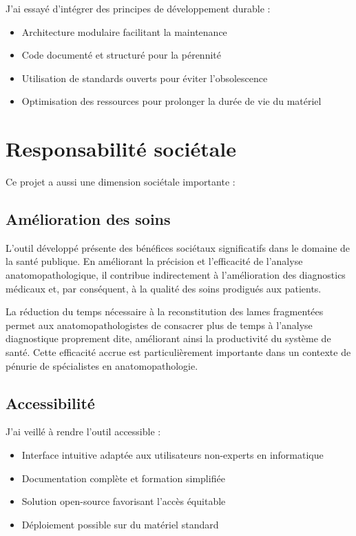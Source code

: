 \documentclass[11pt,a4paper]{report}
\begin{document}
J'ai essayé d'intégrer des principes de développement durable :

\begin{itemize}
\item Architecture modulaire facilitant la maintenance
\item Code documenté et structuré pour la pérennité
\item Utilisation de standards ouverts pour éviter l'obsolescence
\item Optimisation des ressources pour prolonger la durée de vie du matériel
\end{itemize}

\section{Responsabilité sociétale}

Ce projet a aussi une dimension sociétale importante :

\subsection{Amélioration des soins}

L'outil développé présente des bénéfices sociétaux significatifs dans le domaine de la santé publique. En améliorant la précision et l'efficacité de l'analyse anatomopathologique, il contribue indirectement à l'amélioration des diagnostics médicaux et, par conséquent, à la qualité des soins prodigués aux patients.

La réduction du temps nécessaire à la reconstitution des lames fragmentées permet aux anatomopathologistes de consacrer plus de temps à l'analyse diagnostique proprement dite, améliorant ainsi la productivité du système de santé. Cette efficacité accrue est particulièrement importante dans un contexte de pénurie de spécialistes en anatomopathologie.

\subsection{Accessibilité}

J'ai veillé à rendre l'outil accessible :

\begin{itemize}
\item Interface intuitive adaptée aux utilisateurs non-experts en informatique
\item Documentation complète et formation simplifiée
\item Solution open-source favorisant l'accès équitable
\item Déploiement possible sur du matériel standard
\end{itemize}
\end{document}
